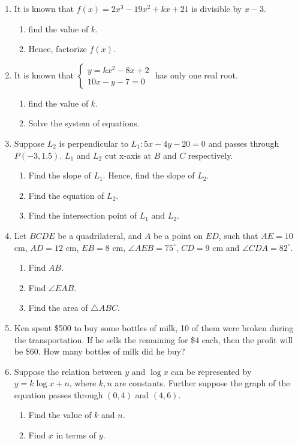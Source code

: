 \documentclass[12pt]{article}
\begin{document}
\begin{enumerate}
        \item It is known that $f(x)=2x^3-19x^2+kx+21$ is divisible by $x-3$.\begin{enumerate}
            \item find the value of $k$.
            \item Hence, factorize $f(x)$.
        \end{enumerate}
        \item It is known that $\begin{cases}
            y=kx^2-8x+2\\
            10x-y-7=0
        \end{cases}$ has only one real root.\begin{enumerate}
            \item find the value of $k$.
            \item Solve the system of equations.
        \end{enumerate}
        \item Suppose $L_2$ is perpendicular to $L_1:5x-4y-20=0$ and passes through $P(-3,1.5)$. $L_1$ and $L_2$ cut x-axis at $B$ and $C$ respectively.\begin{enumerate}
            \item Find the slope of $L_1$. Hence, find the slope of $L_2$.
            \item Find the equation of $L_2$.
            \item Find the intersection point of $L_1$ and $L_2$.
        \end{enumerate}
        \item Let $BCDE$ be a quadrilateral, and $A$ be a point on $ED$, such that $AE=10$ cm, $AD=12$ cm, $EB=8$ cm, $\angle AEB=75^\circ$, $CD=9$ cm and $\angle CDA=82^\circ$.\begin{enumerate}
            \item Find $AB$.
            \item Find $\angle EAB$.
            \item Find the area of $\triangle ABC$.
        \end{enumerate}
        \item Ken spent \$500 to buy some bottles of milk, 10 of them were broken during the transportation. If he sells the remaining for \$4 each, then the profit will be \$60. How many bottles of milk did he buy?
        \item Suppose the relation between $y$ and $\log{x}$ can be represented by $y=k\log{x}+n$, where $k,n$ are constants. Further suppose the graph of the equation passes through $(0,4)$ and $(4,6)$.\begin{enumerate}
            \item Find the value of $k$ and $n$.
            \item Find $x$ in terms of $y$.
        \end{enumerate}
    \end{enumerate}
\end{document}

